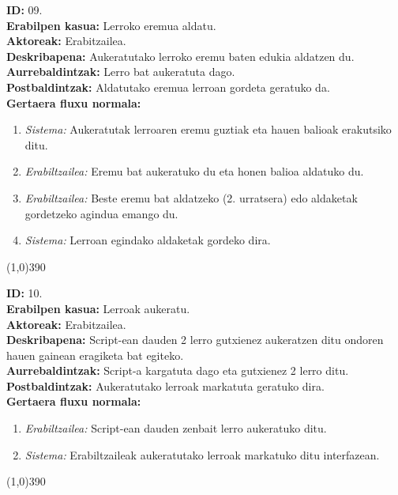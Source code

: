 \noindent
\textbf{ID:} 09.\\
\textbf{Erabilpen kasua:} Lerroko eremua aldatu.\\
\textbf{Aktoreak:} Erabitzailea.\\
\textbf{Deskribapena:} Aukeratutako lerroko eremu baten edukia aldatzen du.\\
\textbf{Aurrebaldintzak:} Lerro bat aukeratuta dago.\\
\textbf{Postbaldintzak:} Aldatutako eremua lerroan gordeta geratuko da.\\
\textbf{Gertaera fluxu normala:}
\begin{enumerate}
	\item \textit{Sistema:} Aukeratutak lerroaren eremu guztiak eta hauen balioak erakutsiko ditu.
	\item \textit{Erabiltzailea:} Eremu bat aukeratuko du eta honen balioa aldatuko du.
	\item \textit{Erabiltzailea:} Beste eremu bat aldatzeko (2. urratsera) edo aldaketak gordetzeko agindua emango du.
	\item \textit{Sistema:} Lerroan egindako aldaketak gordeko dira.
\end{enumerate}
\line(1,0){390}

\noindent
\textbf{ID:} 10.\\
\textbf{Erabilpen kasua:} Lerroak aukeratu.\\
\textbf{Aktoreak:} Erabitzailea.\\
\textbf{Deskribapena:} Script-ean dauden 2 lerro gutxienez aukeratzen ditu ondoren hauen gainean eragiketa bat egiteko.\\
\textbf{Aurrebaldintzak:} Script-a kargatuta dago eta gutxienez 2 lerro ditu.\\
\textbf{Postbaldintzak:} Aukeratutako lerroak markatuta geratuko dira.\\
\textbf{Gertaera fluxu normala:}
\begin{enumerate}
	\item \textit{Erabiltzailea:} Script-ean dauden zenbait lerro aukeratuko ditu.
	\item \textit{Sistema:} Erabiltzaileak aukeratutako lerroak markatuko ditu interfazean.
\end{enumerate}
\line(1,0){390}

